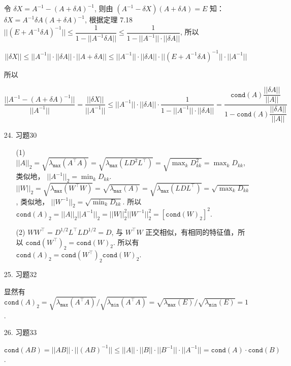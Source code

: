 \documentclass{article}
\begin{document}
\begin{itemize}
    令 $\delta X = A^{-1} - (A + \delta A) ^{-1}$, 则由 $(A^{-1} - \delta X)(A + \delta A) = E$ 知：$\delta X = A^{-1}\delta A (A+\delta A)^{-1}$, 根据定理 7.18 $||(E + A^{-1} \delta A)^{-1}|| \leq \dfrac{1}{1 - ||A^{-1}\delta A||} \leq \dfrac{1}{1 - ||A^{-1}||\cdot ||\delta A||}$, 所以 

    $$||\delta X|| \leq ||A^{-1}||\cdot ||\delta A|| \cdot ||A + \delta A|| \leq ||A^{-1}||\cdot ||\delta A|| \cdot ||(E + A^{-1}\delta A)^{-1}||\cdot ||A^{-1}||$$

    所以 

    $$\dfrac{||A^{-1} - (A + \delta A)^{-1}||}{||A^{-1}||} = \dfrac{||\delta X||}{||A^{-1}||} \leq ||A^{-1}||\cdot ||\delta A||\cdot \dfrac{1}{1 - ||A^{-1}||\cdot ||\delta A||} = \dfrac{\mathtt{cond}(A)\dfrac{||\delta A||}{||A||}}{1 - \mathtt{cond}(A)\dfrac{||\delta A||}{||A||}}$$

    \item [24.] 习题30
    \begin{spacing}{1.5}
    \begin{itemize}
        \item [(1)] $||A||_2 = \sqrt{\lambda_{\mathtt{max}} (A^\top A)} = \sqrt {\lambda_{\mathtt{max}}(LD^2L^\top)} = \sqrt{\max_{k} D_{kk}^2} = \max_{k} D_{kk}$, 类似地， $||A^{-1}||_2 = \min_{k} D_{kk}$. $||W||_2 = \sqrt{\lambda_{\mathtt{max}}(W^\top W)} = \sqrt{\lambda_{\mathtt{max}} (A)} = \sqrt{\lambda_{\mathtt{max}} (LDL^\top)} = \sqrt{\max_{k} D_{kk}}$, 类似地， $||W^{-1}||_2 = \sqrt{\min_{k} D_{kk}}$. 
        所以 $\mathtt{cond}(A)_2 = ||A||_2||A^{-1}||_2 = ||W||_2^2||W^{-1}||_2^2 = \left[\mathtt{cond}(W)_2\right]^2$.
        \item [(2)] $WW^\top = D^{1/2}L^\top LD^{1/2} = D$, 与 $W^\top W$ 正交相似，有相同的特征值，所以 $\mathtt{cond}(W^\top)_2 = \mathtt{cond}(W)_2$. 所以有 $\mathtt{cond}(A)_2 = \mathtt{cond}(W^\top)_2\mathtt{cond}(W)_2$.
    \end{itemize}
    \end{spacing}

    \item [25.] 习题32
    
    显然有 $\mathtt{cond}(A)_2 = \sqrt{\lambda_{\mathtt{max}} (A^\top A)} / \sqrt{\lambda_{\mathtt{min}} (A^\top A)} = \sqrt{\lambda_{\mathtt{max}}(E)} / \sqrt{\lambda_{\mathtt{min}}(E)} = 1$.

    \item [26.] 习题33
    
    $\mathtt{cond}(AB) = ||AB||\cdot ||(AB)^{-1}|| \leq ||A||\cdot ||B||\cdot ||B^{-1}|| \cdot ||A^{-1}|| = \mathtt{cond}(A) \cdot \mathtt{cond}(B)$.


\end{itemize}
\end{document}

